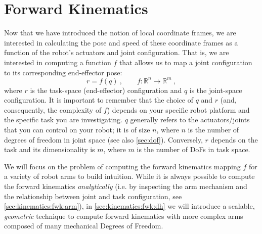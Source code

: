 \section{Forward Kinematics}\label{sec:kinematics:fwd}

Now that we have introduced the notion of local coordinate frames, we are interested in calculating the pose and speed of these coordinate frames as a function of the robot's actuators and joint configuration.
That is, we are interested in computing a function $f$ that allows us to map a joint configuration to its corresponding end-effector pose:
\begin{equation}\label{eq:kinematics:forward}
r=f(q)\ , \qquad f : \mathbb{R}^n \rightarrow \mathbb{R}^m \ ,
\end{equation}
where $r$ is the task-space (end-effector) configuration and $q$ is the joint-space configuration.
It is important to remember that the choice of $q$ and $r$ (and, consequently, the complexity of $f$) depends on your specific robot platform and the specific task you are investigating.
$q$ generally refers to the actuators/joints that you can control on your robot; it is of size $n$, where $n$ is the number of degrees of freedom in joint space (see also \cref{sec:dof}).
Conversely, $r$ depends on the task and its dimensionality is $m$, where $m$ is the number of DoFs in task space.

We will focus on the problem of computing the forward kinematics mapping $f$ for a variety of robot arms to build intuition.
While it is always possible to compute the forward kinematics \textsl{analytically} (i.e. by inspecting the arm mechanism and the relationship between joint and task configuration, see \cref{sec:kinematics:fwk:arm}), in \cref{sec:kinematics:fwk:dh} we will introduce a scalable, \textsl{geometric} technique to compute forward kinematics with more complex arms composed of many mechanical Degrees of Freedom.

